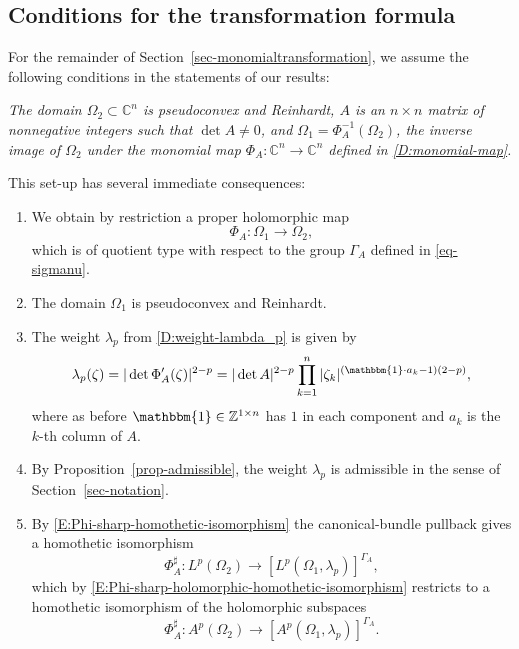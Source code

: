 \documentclass[letterpaper,11pt,reqno]{amsart}
\theoremstyle{plain}
\theoremstyle{definition}
\theoremstyle{remark}
\theoremstyle{remark}
\numberwithin{equation}{section}
\newcommand{\one}{\mathbbm{1}}
\newcommand{\C}{{\mathbb C}}
\newcommand{\Z}{{\mathbb Z}}
\begin{document}
 
\subsection{Conditions for the transformation formula}\label{SS:gen-hypothesis}

For the remainder of Section~\ref{sec-monomialtransformation}, we assume the following conditions in the statements of our results:

{\em The domain $\Omega_2 \subset \C^n$ is pseudoconvex and Reinhardt, $A$ is an $n \times n$  matrix of nonnegative integers such that $\det A \not=0$, and $\Omega_1 = \Phi_A^{-1}(\Omega_2)$, the inverse image of $\Omega_2$ under the monomial map $\Phi_A:\C^n\to \C^n$ defined in \eqref{D:monomial-map}.}

This set-up has several immediate consequences:
\begin{enumerate}
\item We obtain by restriction a proper holomorphic map
\begin{equation*}
    \Phi_A:\Omega_1 \to \Omega_2,
\end{equation*}
which is of quotient type with respect to the group $\Gamma_A$ defined in \eqref{eq-sigmanu}. 
\item The domain $\Omega_1$ is pseudoconvex and Reinhardt.
\item The weight $\lambda_p$ from \eqref{D:weight-lambda_p} is given by
\begin{equation}\label{E:lambda_p-monomial-map}
    \lambda_p(\zeta) = |\det \Phi_A'(\zeta)|^{2-p} = |\det A|^{2-p} \prod_{k=1}^n |\zeta_k|^{(\one \cdot a_k - 1)(2-p)},
\end{equation}
where as before $\one \in \Z^{1 \times n}$ has $1$ in each component and $a_k$ is the $k$-th column of $A$. 
\item By Proposition~\ref{prop-admissible}, the weight $\lambda_p$ 
is admissible in the sense of Section~\ref{sec-notation}.
\item By \eqref{E:Phi-sharp-homothetic-isomorphism} the canonical-bundle pullback gives a homothetic isomorphism 
\[
\Phi_A^{\sharp}:L^p(\Omega_2) \to [L^p(\Omega_1,\lambda_p)]^{\Gamma_A},
\]
which by \eqref{E:Phi-sharp-holomorphic-homothetic-isomorphism} restricts to a homothetic isomorphism of the holomorphic subspaces
\[
\Phi_A^\sharp : A^p(\Omega_2) \to [A^p(\Omega_1,\lambda_p)]^{\Gamma_A}.
\]
\end{enumerate}
\end{document}
